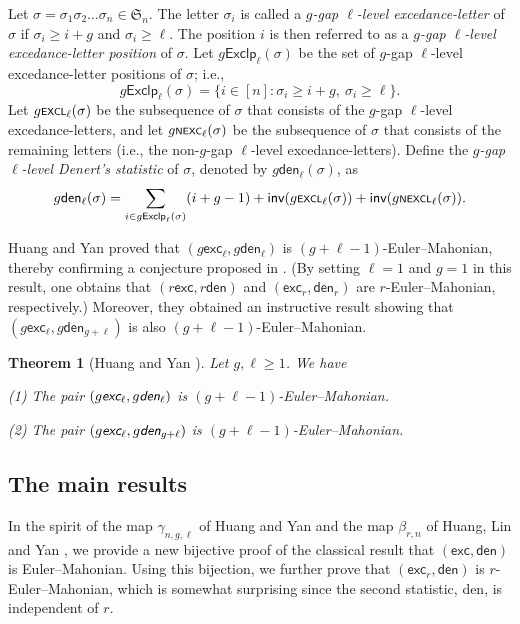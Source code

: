 \documentclass[12pt]{article}
\newtheorem{theorem}{Theorem}[section]
\begin{document}
\vspace{-8pt}
Let $\sigma=\sigma_{1}\sigma_{2}\ldots \sigma_{n}\in\mathfrak{S}_{n}$.
The letter $\sigma_{i}$ is called a \emph{$g$-gap $\ell$-level excedance-letter} of $\sigma$ if $\sigma_{i}\geq i+g$ and $\sigma_{i}\geq \ell$.
The position $i$ is then referred to as a \emph{$g$-gap $\ell$-level excedance-letter position} of $\sigma$.
Let $g\textsf{Exclp}_{\ell}(\sigma)$ be the set of $g$-gap $\ell$-level  excedance-letter positions of $\sigma$; i.e.,
$$g\textsf{Exclp}_{\ell}(\sigma)=\{i\in[n]:\sigma_{i}\geq i+g,~ \sigma_{i}\geq \ell\}.$$
Let $g\textsf{\scriptsize{EXCL}}_{\ell}(\sigma)$ be the subsequence of $\sigma$  that consists of the $g$-gap $\ell$-level excedance-letters,
and let $g\textsf{\scriptsize{NEXC}}_{\ell}(\sigma)$ be the subsequence of $\sigma$  that consists of the remaining letters
(i.e., the non-$g$-gap $\ell$-level excedance-letters). 
Define the \emph{$g$-gap $\ell$-level Denert's statistic} of $\sigma$, denoted by $g\textsf{den}_{\ell}(\sigma)$, as 
\vspace{-8pt}
$$
g\textsf{den}_{\ell}(\sigma)=\sum_{i\in g\textsf{Exclp}_{\ell}(\sigma)}(i+g-1)+\textsf{inv}(g\textsf{\scriptsize{EXCL}}_{\ell}(\sigma))+\textsf{inv}(g\textsf{\scriptsize{NEXCL}}_{\ell}(\sigma)).
$$

\vspace{-8pt}
Huang and Yan \cite{Yan-2025-2} proved that  $(g\textsf{exc}_{\ell},g\textsf{den}_{\ell})$ is $(g+\ell-1)$-Euler--Mahonian, thereby confirming a conjecture proposed in \cite{Liu-2024}.
(By setting $\ell=1$ and $g=1$ in this result,
one obtains that $(r\textsf{exc},r\textsf{den})$ and $(\textsf{exc}_{r},\textsf{den}_{r})$ are $r$-Euler--Mahonian,
respectively.)
Moreover, they obtained an instructive result showing that $(g\textsf{exc}_{\ell},g\textsf{den}_{g+\ell})$ is also $(g+\ell-1)$-Euler--Mahonian.	
\begin{theorem}[Huang and Yan \cite{Yan-2025-2}]\label{thm-Huang-Yan} 
	Let $g,\ell\geq1$. We have
	
	(1) The pair $(g\emph{\textsf{exc}}_{\ell},g\emph{\textsf{den}}_{\ell})$ is $(g+\ell-1)$-Euler--Mahonian.
	
	(2) The pair $(g\emph{\textsf{exc}}_{\ell},g\emph{\textsf{den}}_{g+\ell})$ is $(g+\ell-1)$-Euler--Mahonian.	
\end{theorem}

\subsection{The main results}
In the spirit of the map $\gamma_{n,g,\ell}$ of Huang and Yan \cite{Yan-2025-2} and the map $\beta_{r,n}$ of Huang, Lin and Yan \cite{Yan-2025},
we provide a new bijective proof of the classical result that $(\textsf{exc},\textsf{den})$ is Euler--Mahonian.
Using this bijection, we further prove that
$(\textsf{exc}_{r},\textsf{den})$ is $r$-Euler--Mahonian,
which is somewhat surprising since  the second statistic, \textsf{den}, is independent of $r$.
\end{document}
